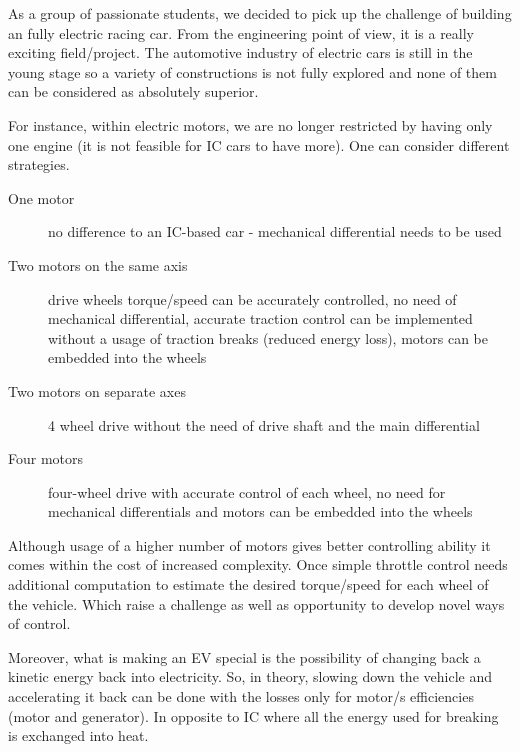 As a group of passionate students, we decided to pick up the challenge of building an fully electric racing car. From the engineering point of view, it is a really exciting field/project. The automotive industry of electric cars is still in the young stage so a variety of constructions is not fully explored and none of them can be considered as absolutely superior.


For instance, within electric motors, we are no longer restricted by having only one engine (it is not feasible for IC cars to have more). One can consider different strategies.
\begin{description}
    \item[One motor] no difference to an IC-based car - mechanical differential needs to be used
    \item[Two motors on the same axis] drive wheels torque/speed can be accurately controlled, no need of mechanical differential, accurate traction control can be implemented without a usage of traction breaks (reduced energy loss), motors can be embedded into the wheels
    \item[Two motors on separate axes] 4 wheel drive without the need of drive shaft and the main differential
    \item[Four motors] four-wheel drive with accurate control of each wheel, no need for mechanical differentials and motors can be embedded into the wheels
\end{description}
Although usage of a higher number of motors gives better controlling ability it comes within the cost of increased complexity. Once simple throttle control needs additional computation to estimate the desired torque/speed for each wheel of the vehicle. Which raise a challenge as well as opportunity to develop novel ways of control.

Moreover, what is making an EV special is the possibility of changing back a kinetic energy back into electricity. So, in theory, slowing down the vehicle and accelerating it back can be done with the losses only for motor/s efficiencies (motor and generator). In opposite to IC where all the energy used for breaking is exchanged into heat.



